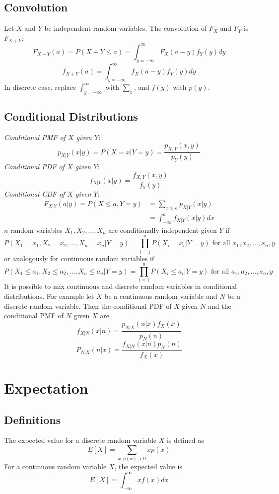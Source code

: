 \documentclass[12pt]{article}
\begin{document}
\subsection{Convolution}
Let $X$ and $Y$ be independent random variables. The convolution of $F_X$ and $F_Y$ is $F_{X+Y}$:
\[
    F_{X+Y}(a) = P(X+Y \leq a) = \int_{y=-\infty}^{\infty} F_X (a-y)f_Y(y)dy
\]
\[
    f_{X+Y}(a) = \int_{y=-\infty}^{\infty} f_X (a-y)f_Y(y)dy
\]
In discrete case, replace $\int_{y=-\infty}^{\infty}$ with $\sum_{y}$, and $f(y)$ with $p(y)$.
\subsection{Conditional Distributions}
\emph{Conditional PMF of $X$ given $Y$}:
\[
    p_{X|Y}(x|y) = P(X=x|Y=y) = \frac{p_{X,Y}(x,y)}{p_Y(y)}
\]
\emph{Conditional PDF of $X$ given $Y$}:
\[
    f_{X|Y}(x|y) = \frac{f_{X,Y}(x,y)}{f_Y(y)}
\]
\emph{Conditional CDF of $X$ given $Y$}:
\begin{align*}
    F_{X|Y}(a|y) = P(X \leq a, Y=y) &= \sum_{x\leq a} p_{X|Y}(x|y) \\
                                    &=\int_{-\infty}^{a} f_{X|Y} (x|y) dx
\end{align*}
$n$ random variables $X_1, X_2, \ldots, X_n$ are conditionally independent given $Y$ if
\[
    P(X_1 = x_1, X_2 = x_2, \ldots, X_n = x_n|Y=y) = \prod_{i=1}^n P(X_i = x_i|Y=y) \text{ for all } x_1, x_2, \ldots, x_n, y
\]
or analogously for continuous random variables if
\[
    P(X_1 \leq a_1, X_2 \leq a_2, \ldots, X_n \leq a_n|Y=y) = \prod_{i=1}^n P(X_i \leq a_i|Y=y) \text{ for all } a_1, a_2, \ldots, a_n, y
\]
It is possible to mix continuous and discrete random variables in conditional distributions. For example let $X$ be a continuous random variable and $N$ be a discrete random variable. Then the conditional PDF of $X$ given $N$ and the conditional PMF of $N$ given $X$ are
\[
    f_{X|N}(x|n) = \frac{p_{N|X}(n|x)f_X(x)}{p_N(n)}
\]
\[
    P_{N|X}(n|x) = \frac{f_{X|N}(x|n)p_N(n)}{f_X(x)}
\]

\section{Expectation}
\subsection{Definitions}
The expected value for a discrete random variable $X$ is defined as
\[
    E[X] = \sum_{x: p(x) > 0} x p(x)
\]
For a continuous random variable $X$, the expected value is
\[
    E[X] = \int_{-\infty}^{\infty} x f(x) dx
\]
\end{document}
